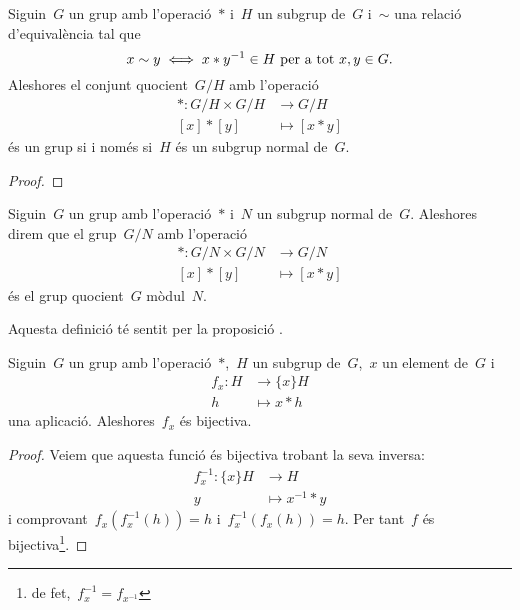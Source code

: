 \documentclass[../../main.tex]{subfiles}
\begin{document}
    \begin{proposition}\label{prop:grup quocient}
        Siguin~\(G\) un grup amb l'operació~\(\ast\) i~\(H\) un subgrup de~\(G\) i~\(\sim\) una relació d'equivalència tal que
        \[
            x\sim y\iff x\ast y^{-1}\in H\text{ per a tot }x,y\in G.
        \]
        Aleshores el conjunt quocient~\(G/H\) amb l'operació
        \begin{align*}
        \ast\colon G/H\times G/H&\longrightarrow G/H\\
        [x]\ast[y]&\longmapsto[x\ast y]
        \end{align*}
        és un grup si i només si~\(H\) és un subgrup normal de~\(G\).
        \begin{proof}
        \end{proof}
    \end{proposition}
    \begin{definition}
        \label{def:grup quocient}\label{def:relació d'equivalència entre grups}\label{def:producte entre classes versió grups}
        Siguin~\(G\) un grup amb l'operació~\(\ast\) i~\(N\) un subgrup normal de~\(G\).
        Aleshores direm que el grup~\(G/N\) amb l'operació
        \begin{align*}
        \ast\colon G/N\times G/N&\longrightarrow G/N\\
        [x]\ast[y]&\longmapsto[x\ast y]
        \end{align*}
        és el grup quocient~\(G\) mòdul~\(N\).

        Aquesta definició té sentit per la proposició .
    \end{definition}
    \begin{lemma}
        \label{lema:operar en grups és bijectiu}
        Siguin~\(G\) un grup amb l'operació~\(\ast\),~\(H\) un subgrup de~\(G\),~\(x\) un element de~\(G\) i
        \begin{align*}
        f_{x}\colon H&\longrightarrow\{x\}H\\
        h&\longmapsto x\ast h
        \end{align*}
        una aplicació.
        Aleshores~\(f_{x}\) és bijectiva.
        \begin{proof}
            Veiem que aquesta funció és bijectiva trobant la seva inversa:
            \begin{align*}
            f_{x}^{-1}\colon\{x\}H&\longrightarrow H\\
            y&\longmapsto x^{-1}\ast y
            \end{align*}
            i comprovant~\(f_{x}(f_{x}^{-1}(h))=h\) i~\(f_{x}^{-1}(f_{x}(h))=h\).
            Per tant~\(f\) és bijectiva\footnote{de fet,~\(f_{x}^{-1}=f_{x^{-1}}\)}.
        \end{proof}
    \end{lemma}
\end{document}
